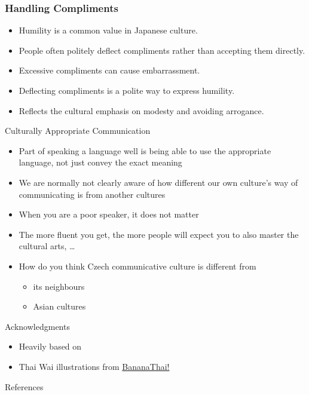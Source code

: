\documentclass[xetex]{beamer}
\begin{document}
\begin{frame}
\frametitle{Handling Compliments}
\begin{itemize}
    \item Humility is a common value in Japanese culture.
    \item People often politely deflect compliments rather than accepting them directly.
    \item Excessive compliments can cause embarrassment.
    \item Deflecting compliments is a polite way to express humility.
    \item Reflects the cultural emphasis on modesty and avoiding arrogance.
\end{itemize}
\end{frame}


\begin{frame}{Culturally Appropriate Communication}
  \begin{itemize}
  \item Part of speaking a language well is being able to use the
    appropriate language, not just convey the exact meaning
  \item We are normally not clearly aware of how different our own
    culture's way of communicating is from another cultures
  \item When you are a poor speaker, it does not matter
  \item The more fluent you get, the more people will expect you to also master the cultural arts, \ldots
  \item How do you think Czech communicative culture is different from
    \begin{itemize}
    \item its neighbours
    \item Asian cultures
    \end{itemize}
   \end{itemize}
  
\end{frame}

\begin{frame}{Acknowledgments}

  \begin{itemize}
  \item Heavily based on \citet[Chapter 7]{Goddard:2005}
  \item Thai Wai illustrations from \href{https://www.bananathaischool.com/}{BananaThai!}
  \end{itemize}
  
\end{frame}

\begin{frame}{References}


\end{frame}
\end{document}

